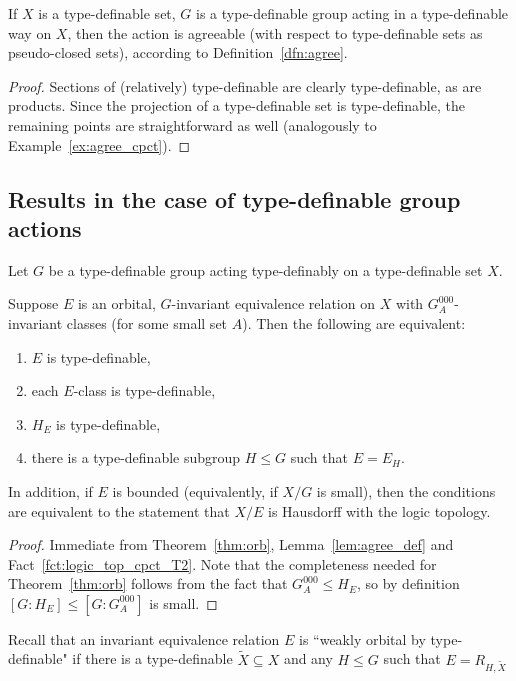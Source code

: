 	\begin{lem}
		\label{lem:agree_def}
		If $X$ is a type-definable set, $G$ is a type-definable group acting in a type-definable way on $X$, then the action is agreeable (with respect to type-definable sets as pseudo-closed sets), according to Definition~\ref{dfn:agree}.
	\end{lem}
	\begin{proof}
		Sections of (relatively) type-definable are clearly type-definable, as are products. Since the projection of a type-definable set is type-definable, the remaining points are straightforward as well (analogously to Example~\ref{ex:agree_cpct}).
	\end{proof}
	
	
	\subsection*{Results in the case of type-definable group actions}
	
	
	\begin{thm}
		\label{thm:orb_def}
		Let $G$ be a type-definable group acting type-definably on a type-definable set $X$.
		
		Suppose $E$ is an orbital, $G$-invariant equivalence relation on $X$ with $G^{000}_A$-invariant classes (for some small set $A$). Then the following are equivalent:
		\begin{enumerate}
			\item
			$E$ is type-definable,
			\item
			each $E$-class is type-definable,
			\item
			$H_E$ is type-definable,
			\item
			there is a type-definable subgroup $H\leq G$ such that $E=E_H$.
		\end{enumerate}
		In addition, if $E$ is bounded (equivalently, if $X/G$ is small), then the conditions are equivalent to the statement that $X/E$ is Hausdorff with the logic topology.
	\end{thm}
	\begin{proof}
		Immediate from Theorem~\ref{thm:orb}, Lemma~\ref{lem:agree_def} and Fact~\ref{fct:logic_top_cpct_T2}. Note that the completeness needed for Theorem~\ref{thm:orb} follows from the fact that $G^{000}_A\leq H_E$, so by definition $[G:H_E]\leq [G:G^{000}_A]$ is small.
	\end{proof}
	
	Recall that an invariant equivalence relation $E$ is ``weakly orbital by type-definable" if there is a type-definable $\tilde X\subseteq X$ and any $H\leq G$ such that $E=R_{H,\tilde X}$
	
